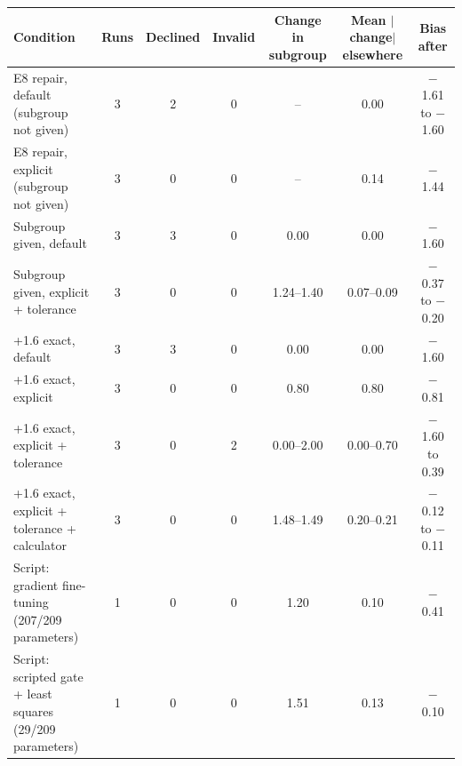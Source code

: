 \begin{tabular}{lcccccc}
\toprule
Condition & Runs & Declined & Invalid & Change in subgroup & Mean $|$change$|$ elsewhere & Bias after \\
\midrule
E8 repair, default (subgroup not given) & 3 & 2 & 0 & -- & 0.00 & $-$1.61 to $-$1.60 \\
E8 repair, explicit (subgroup not given) & 3 & 0 & 0 & -- & 0.14 & $-$1.44 \\
Subgroup given, default & 3 & 3 & 0 & 0.00 & 0.00 & $-$1.60 \\
Subgroup given, explicit + tolerance & 3 & 0 & 0 & 1.24--1.40 & 0.07--0.09 & $-$0.37 to $-$0.20 \\
+1.6 exact, default & 3 & 3 & 0 & 0.00 & 0.00 & $-$1.60 \\
+1.6 exact, explicit & 3 & 0 & 0 & 0.80 & 0.80 & $-$0.81 \\
+1.6 exact, explicit + tolerance & 3 & 0 & 2 & 0.00--2.00 & 0.00--0.70 & $-$1.60 to 0.39 \\
+1.6 exact, explicit + tolerance + calculator & 3 & 0 & 0 & 1.48--1.49 & 0.20--0.21 & $-$0.12 to $-$0.11 \\
\midrule
Script: gradient fine-tuning (207/209 parameters) & 1 & 0 & 0 & 1.20 & 0.10 & $-$0.41 \\
Script: scripted gate + least squares (29/209 parameters) & 1 & 0 & 0 & 1.51 & 0.13 & $-$0.10 \\
\bottomrule
\end{tabular}
